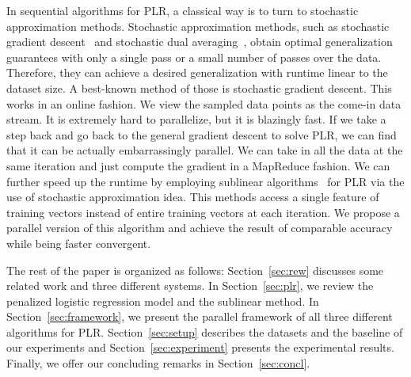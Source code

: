 \documentclass{llncs}
\begin{document}
In sequential algorithms for PLR, a classical way is to turn to stochastic approximation methods.
Stochastic approximation methods, such as stochastic gradient descent~\cite{zhang2004solving} and stochastic dual averaging~\cite{xiao2010dual}, obtain optimal generalization guarantees with only a single pass or a small number of passes over the data.
Therefore, they can achieve a desired generalization with runtime linear to the dataset size.
A best-known method of those is stochastic gradient descent. This works in an online fashion. We view the sampled data points as the come-in data stream. It is extremely hard to parallelize, but it is blazingly fast.
If we take a step back and go back to the general gradient descent to solve PLR, we can find that it can be actually embarrassingly parallel. We can take in all the data at the same iteration and just compute the gradient in a MapReduce fashion.
We can further speed up the runtime by employing sublinear algorithms~\cite{peng2012sublinear} for PLR via the use of stochastic approximation idea.
This methods access a single feature of training vectors instead of entire training vectors at each iteration.
We propose a parallel version of this algorithm and achieve the result of comparable accuracy while being faster convergent.
	
The rest of the paper is organized as follows:
Section~\ref{sec:rew} discusses some related work and three different systems.
In Section~\ref{sec:plr}, we review the penalized logistic regression model and the sublinear method.
In Section~\ref{sec:framework}, we present the parallel framework of all three different algorithms for PLR.
Section~\ref{sec:setup} describes the datasets and the baseline of our experiments and Section~\ref{sec:experiment} presents the experimental results.
Finally, we offer our concluding remarks in Section~\ref{sec:concl}.
\end{document}
